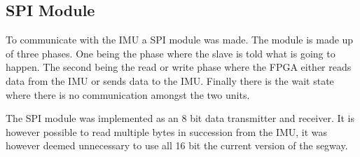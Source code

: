 \subsection{SPI Module}
To communicate with the IMU a SPI module was made.
The module is made up of three phases.
One being the phase where the slave is told what is going to happen.
The second being the read or write phase where the FPGA either reads data from the IMU or sends data to the IMU.
Finally there is the wait state where there is no communication amongst the two units.

The SPI module was implemented as an 8 bit data transmitter and receiver.
It is however possible to read multiple bytes in succession from the IMU, it was however deemed unnecessary to use all 16 bit the current version of the segway.